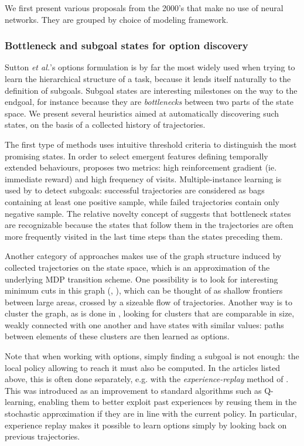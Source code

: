 \documentclass{article}
\newcommand{\etal}{\textit{et al.}}
\begin{document}
We first present various proposals from the 2000's that make no use of neural networks. They are grouped by choice of modeling framework.

\subsubsection{Bottleneck and subgoal states for option discovery}

Sutton \etal's options formulation \cite{sutton_between_1999} is by far the most widely used when trying to learn the hierarchical structure of a task, because it lends itself naturally to the definition of subgoals. Subgoal states are interesting milestones on the way to the endgoal, for instance because they are \textit{bottlenecks} between two parts of the state space. We present several heuristics aimed at automatically discovering such states, on the basis of a collected history of trajectories.

The first type of methods uses intuitive threshold criteria to distinguish the most promising states. In order to select emergent features defining temporally extended behaviours, \cite{digney_learning_1998} proposes two metrics: high reinforcement gradient (ie. immediate reward) and high frequency of visits. Multiple-instance learning is used by \cite{mcgovern_automatic_2001} to detect subgoals: successful trajectories are considered as bags containing at least one positive sample, while failed trajectories contain only negative sample. The relative novelty concept of \cite{simsek_using_2004} suggests that bottleneck states are recognizable because the states that follow them in the trajectories are often more frequently visited in the last time steps than the states preceding them.

Another category of approaches makes use of the graph structure induced by collected trajectories on the state space, which is an approximation of the underlying MDP transition scheme. One possibility is to look for interesting minimum cuts in this graph (\cite{goos_q-cutdynamic_2002}, \cite{simsek_identifying_2005}), which can be thought of as shallow frontiers between large areas, crossed by a sizeable flow of trajectories. Another way is to cluster the graph, as is done in \cite{mannor_dynamic_2004}, looking for clusters that are comparable in size, weakly connected with one another and have states with similar values: paths between elements of these clusters are then learned as options.

Note that when working with options, simply finding a subgoal is not enough: the local policy allowing to reach it must also be computed. In the articles listed above, this is often done separately, e.g. with the \textit{experience-replay} method of \cite{lin_self-improving_1992}. This was introduced as an improvement to standard algorithms such as Q-learning, enabling them to better exploit past experiences by reusing them in the stochastic approximation if they are in line with the current policy. In particular, experience replay makes it possible to learn options simply by looking back on previous trajectories.
\end{document}
